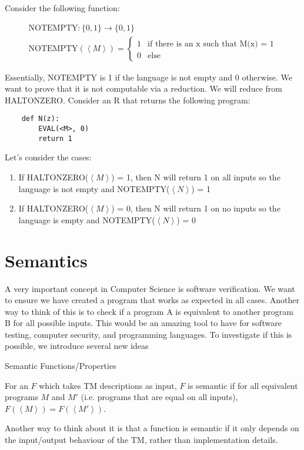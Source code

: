 \begin{example}
    
    Consider the following function:

    \begin{gather*}
        \text{NOTEMPTY}: \{0, 1\} \rightarrow \{0, 1\} \\
        \text{NOTEMPTY}(\left<M\right>) = \begin{cases}
            1 & \text{if there is an x such that M(x) = 1} \\
            0 & \text{else}
        \end{cases}
    \end{gather*}

    Essentially, NOTEMPTY is 1 if the language is not empty and 0 otherwise. We want to prove that it is not computable via a reduction. We will reduce from HALTONZERO. Consider an R that returns the following program:

    \begin{verbatim}
    def N(z):
        EVAL(<M>, 0)
        return 1
    \end{verbatim}

    Let's consider the cases:
    \begin{enumerate}
        \item If HALTONZERO($\left<M\right>$) = 1, then N will return 1 on all inputs so the language is not empty and NOTEMPTY($\left<N\right>$) = 1
        \item If HALTONZERO($\left<M\right>$) = 0, then N will return 1 on no inputs so the language is empty and NOTEMPTY($\left<N\right>$) = 0
    \end{enumerate}

\end{example}

\section{Semantics}

A very important concept in Computer Science is software verification. We want to ensure we have created a program that works as expected in all cases. Another way to think of this is to check if a program A is equivalent to another program B for all possible inputs. This would be an amazing tool to have for software testing, computer security, and programming languages. To investigate if this is possible, we introduce several new ideas

\begin{definition}
    Semantic Functions/Properties

    For an $F$ which takes TM descriptions as input, $F$ is semantic if for all equivalent programs $M$ and $M'$ (i.e. programs that are equal on all inputs), $F(\left<M\right>) = F(\left<M'\right>)$. 

    Another way to think about it is that a function is semantic if it only depends on the input/output behaviour of the TM, rather than implementation details.

\end{definition}

